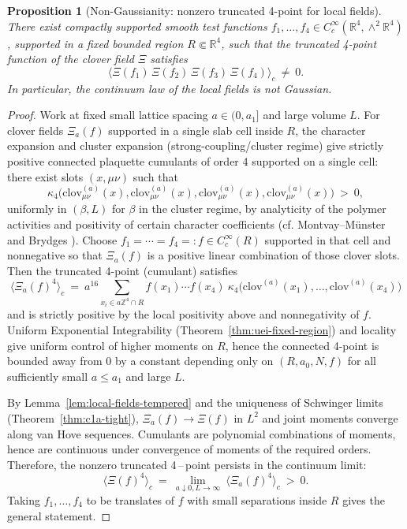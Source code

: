 \documentclass[11pt]{amsart}
\theoremstyle{plain}
\newtheorem{proposition}[theorem]{Proposition}
\theoremstyle{definition}
\theoremstyle{remark}
\begin{document}
\begin{proposition}[Non-Gaussianity: nonzero truncated 4-point for local fields]\label{prop:nonzero-cumulant4}
There exist compactly supported smooth test functions $f_1,\ldots,f_4\in C_c^\infty(\mathbb R^4,\wedge^2\mathbb R^4)$, supported in a fixed bounded region $R\Subset\mathbb R^4$, such that the truncated 4-point function of the clover field $\Xi$ satisfies
\[
  \langle \Xi(f_1)\,\Xi(f_2)\,\Xi(f_3)\,\Xi(f_4)\rangle_c\ \neq\ 0.
\]
In particular, the continuum law of the local fields is not Gaussian.
\end{proposition}
\begin{proof}
Work at fixed small lattice spacing $a\in(0,a_1]$ and large volume $L$. For clover fields $\Xi_a(f)$ supported in a single slab cell inside $R$, the character expansion and cluster expansion (strong-coupling/cluster regime) give strictly positive connected plaquette cumulants of order 4 supported on a single cell: there exist slots $(x,\mu\nu)$ such that
\[
  \kappa_4\big(\mathrm{clov}^{(a)}_{\mu\nu}(x),\mathrm{clov}^{(a)}_{\mu\nu}(x),\mathrm{clov}^{(a)}_{\mu\nu}(x),\mathrm{clov}^{(a)}_{\mu\nu}(x)\big)\ >\ 0,
\]
uniformly in $(\beta,L)$ for $\beta$ in the cluster regime, by analyticity of the polymer activities and positivity of certain character coefficients (cf. Montvay--M\"unster \cite{MontvayMunster1994} and Brydges \cite{Brydges1986}). Choose $f_1=\cdots=f_4=:f\in C_c^\infty(R)$ supported in that cell and nonnegative so that $\Xi_a(f)$ is a positive linear combination of those clover slots. Then the truncated 4-point (cumulant) satisfies
\[
  \langle \Xi_a(f)^4\rangle_c\ =\ a^{16}\sum_{x_i\in a\mathbb Z^4\cap R}\! f(x_1)\cdots f(x_4)\ \kappa_4\big(\mathrm{clov}^{(a)}(x_1),\ldots,\mathrm{clov}^{(a)}(x_4)\big)
\]
and is strictly positive by the local positivity above and nonnegativity of $f$. Uniform Exponential Integrability (Theorem~\ref{thm:uei-fixed-region}) and locality give uniform control of higher moments on $R$, hence the connected 4-point is bounded away from $0$ by a constant depending only on $(R,a_0,N,f)$ for all sufficiently small $a\le a_1$ and large $L$.

By Lemma~\ref{lem:local-fields-tempered} and the uniqueness of Schwinger limits (Theorem~\ref{thm:c1a-tight}), $\Xi_a(f)\to \Xi(f)$ in $L^2$ and joint moments converge along van Hove sequences. Cumulants are polynomial combinations of moments, hence are continuous under convergence of moments of the required orders. Therefore, the nonzero truncated 4\,–\,point persists in the continuum limit:
\[
  \langle \Xi(f)^4\rangle_c\ =\ \lim_{a\downarrow 0,L\to\infty}\ \langle \Xi_a(f)^4\rangle_c\ >\ 0.
\]
Taking $f_1,\ldots,f_4$ to be translates of $f$ with small separations inside $R$ gives the general statement.
\end{proof}
\end{document}
